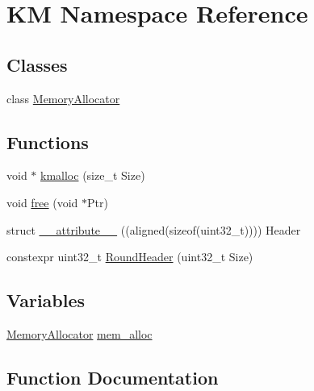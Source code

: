\hypertarget{namespace_k_m}{}\section{KM Namespace Reference}
\label{namespace_k_m}
\subsection*{Classes}
\begin{DoxyCompactItemize}
\item 
class \hyperlink{class_k_m_1_1_memory_allocator}{Memory\+Allocator}
\end{DoxyCompactItemize}
\subsection*{Functions}
\begin{DoxyCompactItemize}
\item 
void $\ast$ \hyperlink{namespace_k_m_aaeb8403b430af6311bb3c1df6ae520b6}{kmalloc} (size\+\_\+t Size)
\item 
void \hyperlink{namespace_k_m_a08363437a217255f3f9d2a393a54714b}{free} (void $\ast$Ptr)
\item 
struct \hyperlink{namespace_k_m_af4d93384d0523f6f9ae8fd51aca12199}{\+\_\+\+\_\+attribute\+\_\+\+\_\+} ((aligned(sizeof(uint32\+\_\+t)))) Header
\item 
constexpr uint32\+\_\+t \hyperlink{namespace_k_m_a7ff0d2f89e64f1d4a08bf40e8fa096cc}{Round\+Header} (uint32\+\_\+t Size)
\end{DoxyCompactItemize}
\subsection*{Variables}
\begin{DoxyCompactItemize}
\item 
\hyperlink{class_k_m_1_1_memory_allocator}{Memory\+Allocator} \hyperlink{namespace_k_m_ab71afb37d9950edf604f583b657905aa}{mem\+\_\+alloc}
\end{DoxyCompactItemize}


\subsection{Function Documentation}
\mbox{\label{namespace_k_m_af4d93384d0523f6f9ae8fd51aca12199}} 
